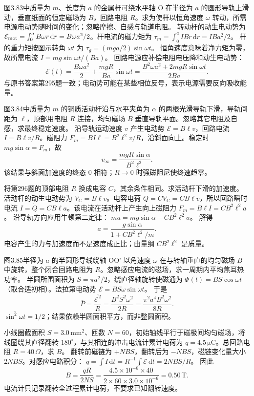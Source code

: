 图3.83中质量为 $m$、长度为 $a$ 的金属杆可绕水平轴 O 在半径为 $a$ 的圆形导轨上滑动，垂直纸面的恒定磁场为 $B$，回路电阻 $R$。求为使杆以恒角速度 $\omega$ 转动，所需电源电动势随时间的变化；忽略摩擦、自感与轨道电阻。
\exsolution
转动杆的动生电动势为
$\mathcal E_{\rm mot}=\int_0^aB\omega r\,\mathrm dr=B\omega a^2/2$。杆电流的磁力矩为
$\tau_m=\int_0^aIBr\,\mathrm dr=IBa^2/2$。
杆的重力矩按图示转角 $\omega t$ 为
$\tau_g=(mga/2)\sin\omega t$。
恒角速度意味着净力矩为零，故所需电流
$I=mg\sin\omega t/(Ba)$。
回路电源应补偿电阻电压降和动生电动势：
\[
\boxed{\mathcal E(t)=\frac{B\omega a^2}{2}
+\frac{mgR}{Ba}\sin\omega t
=\frac{B^2\omega a^2+2mgR\sin\omega t}{2Ba}}.
\]
\excheck 与原书答案第295题一致；电动势可能在某些相位反号，表示电源需要反向吸收能量。

图3.84中质量为 $m$ 的铜质活动杆沿与水平夹角为 $\alpha$ 的两根光滑导轨下滑，导轨间距为 $\ell$，顶部用电阻 $R$ 连接，均匀磁场 $B$ 垂直导轨平面。忽略其它电阻及自感，求最终稳定速度。
\exsolution
沿导轨运动速度 $v$ 产生电动势
$\mathcal E=B\ell v$，回路电流 $I=B\ell v/R$。磁阻力
$F_m=BI\ell=B^2\ell^2v/R$，沿斜面向上。稳定时
$mg\sin\alpha=F_m$，故
\[
\boxed{v_\infty=\frac{mgR\sin\alpha}{B^2\ell^2}}.
\]
\excheck 该结果与斜面加速度的终态 $0$ 相符；$R\to0$ 时强磁阻尼使终速趋零。

将第296题的顶部电阻 $R$ 换成电容 $C$，其余条件相同。求活动杆下滑的加速度。
\exsolution
活动杆的动生电动势为
$V_C=B\ell v$。电容电荷
$Q=CV_C=CB\ell v$，所以回路瞬时电流
$I=\dot Q=CB\ell a$。该电流在活动杆上产生向上磁阻力
$F_m=B\ell I=CB^2\ell^2a$。
沿导轨方向应用牛顿第二定律：
$ma=mg\sin\alpha-CB^2\ell^2a$。
解得
\[
\boxed{a=\frac{g\sin\alpha}{1+CB^2\ell^2/m}}.
\]
\excheck 电容产生的力与加速度而不是速度成正比；由量纲 $CB^2\ell^2$ 是质量。

图3.85半径为 $a$ 的半圆形导线绕轴 OO' 以角速度 $\omega$ 在与转轴垂直的均匀磁场 $B$ 中旋转，整个闭合回路电阻为 $R$。忽略感应电流的磁场，求一周期内平均焦耳热功率。
\exsolution
半圆所围面积为 $S=\pi a^2/2$，绕直径轴旋转使磁通为
$\Phi(t)=BS\cos\omega t$（取合适初相）。法拉第电动势
$\mathcal E=BS\omega\sin\omega t$。
于是
\[
\overline P=\frac{\overline{\mathcal E^2}}R
=\frac{B^2S^2\omega^2}{2R}
=\boxed{\frac{\pi^2a^4B^2\omega^2}{8R}}.
\]
\excheck $\overline{\sin^2\omega t}=1/2$；结果依赖半圆面积平方，而非整圆面积。

小线圈截面积 $S=3.0\,\mathrm{mm^2}$、匝数 $N=60$，初始轴线平行于磁极间均匀磁场，将线圈绕其直径翻转 $180^\circ$，与其相连的冲击电流计累计电荷为 $q=4.5\,\mathrm{\mu C}$。总回路电阻 $R=40\,\Omega$，求 $B$。
\exsolution
翻转前磁链为 $+NBS$，翻转后为 $-NBS$，磁链变化量大小 $2NBS$。对感应电路积分：
$q=\int I\,\mathrm dt=R^{-1}\int\mathcal E\,\mathrm dt=2NBS/R$。
因此
\[
\boxed{B=\frac{qR}{2NS}}
=\frac{4.5\times10^{-6}\times40}
{2\times60\times3.0\times10^{-6}}
=\boxed{0.50\,\mathrm T}.
\]
\excheck 电流计只记录翻转全过程累计电荷，不要求已知翻转速度。

